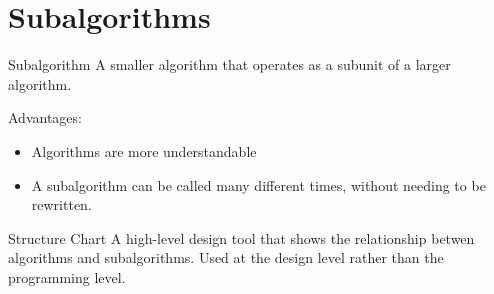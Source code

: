\documentclass[\main/notes.tex]{subfiles}
\begin{document}
		\section{Subalgorithms}
			\begin{definition}{Subalgorithm}
				A smaller algorithm that operates as a subunit of a larger algorithm.
			\end{definition}
			Advantages:
			\begin{itemize}
				\item Algorithms are more understandable
				\item A subalgorithm can be called many different times, without needing to be rewritten.
			\end{itemize}
			\begin{definition}{Structure Chart}
				A high-level design tool that shows the relationship betwen algorithms and subalgorithms. Used at the design level rather than the programming level.
			\end{definition}

\end{document}

